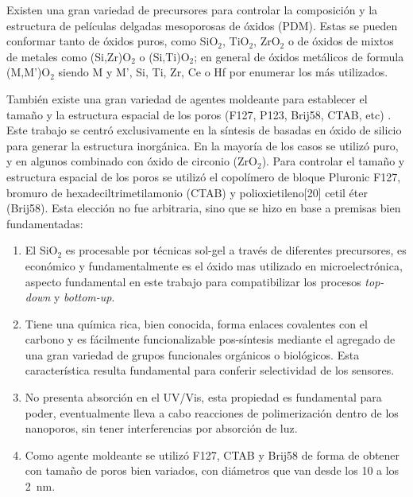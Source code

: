 	Existen una gran variedad de precursores para controlar la composición y la estructura de películas delgadas mesoporosas de óxidos (PDM). Estas se pueden conformar tanto de óxidos puros, como SiO$_2$, TiO$_2$, ZrO$_2$ o de óxidos de mixtos de metales como (Si,Zr)O$_2$ o (Si,Ti)O$_2$; en general de óxidos metálicos de formula (M,M')O$_2$ siendo M y M', Si, Ti, Zr, Ce o Hf por enumerar los más utilizados.

	También existe una gran variedad de agentes moldeante para establecer el tamaño y la estructura espacial de los poros (F127, P123, Brij58, CTAB, etc) \cite{angelome2011,schuth2013,Soler-Illia2006,Soler-Illia2002a}. Este trabajo se centró exclusivamente en la síntesis de \pdm\space basadas en óxido de silicio para generar la estructura inorgánica. En la mayoría de los casos se utilizó puro, y en algunos combinado con óxido de circonio (ZrO$_2$). Para controlar el tamaño y estructura espacial de los poros se utilizó el copolímero de bloque Pluronic F127, bromuro de hexadeciltrimetilamonio (CTAB) y polioxietileno[20] cetil éter (Brij58). Esta elección no fue arbitraria, sino que se hizo en base a premisas bien fundamentadas:
		
		\begin{enumerate}

		\item El SiO$_2$ es procesable por técnicas sol-gel a través de diferentes precursores, es económico y fundamentalmente es el óxido mas utilizado en microelectrónica, aspecto fundamental en este trabajo para compatibilizar los procesos \textit{top-down} y \textit{bottom-up}.

		\item Tiene una química rica, bien conocida, forma enlaces covalentes con el carbono y es fácilmente funcionalizable pos-síntesis mediante el agregado de una gran variedad de grupos funcionales orgánicos o biológicos. Esta característica resulta fundamental para conferir selectividad de los sensores.

		\item No presenta absorción en el UV/Vis, esta propiedad es fundamental para poder, eventualmente lleva a cabo reacciones de polimerización dentro de los nanoporos, sin tener interferencias por absorción de luz.

		\item Como agente moldeante se utilizó F127, CTAB y Brij58 de forma de obtener \pdm\space con tamaño de poros bien variados, con diámetros que van desde los 10 a los \SI{2}{\nm}.

		\end{enumerate}
	
